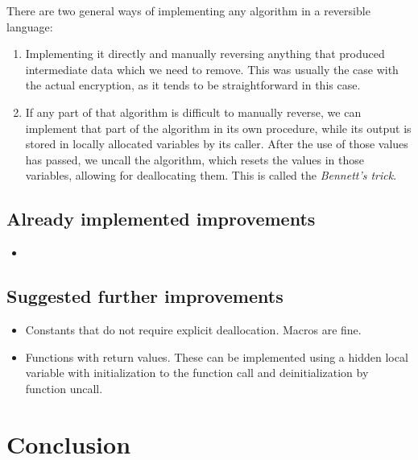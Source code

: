 \documentclass[a4paper,10pt,openright]{memoir}
\newcommand{\term}[1]{\textit{#1}}
\begin{document}
There are two general ways of implementing any algorithm in a 
reversible language:
\begin{enumerate}

\item Implementing it directly and manually reversing anything that 
produced intermediate data which we need to remove. This was usually 
the case with the actual encryption, as it tends to be straightforward 
in this case.

\item If any part of that algorithm is difficult to manually reverse, 
we can implement that part of the algorithm in its own procedure, while 
its output is stored in locally allocated variables by its caller. 
After the use of those values has passed, we uncall the algorithm, 
which resets the values in those variables, allowing for deallocating 
them. This is called the \term{Bennett's trick}.

\end{enumerate}

\section{Already implemented improvements}

\begin{itemize}

\item 

\end{itemize}

\section{Suggested further improvements}

\begin{itemize}

\item Constants that do not require explicit deallocation. Macros are fine.

\item Functions with return values. These can be implemented using a 
hidden local variable with initialization to the function call and 
deinitialization by function uncall.

\end{itemize}

\chapter{Conclusion}
\end{document}
